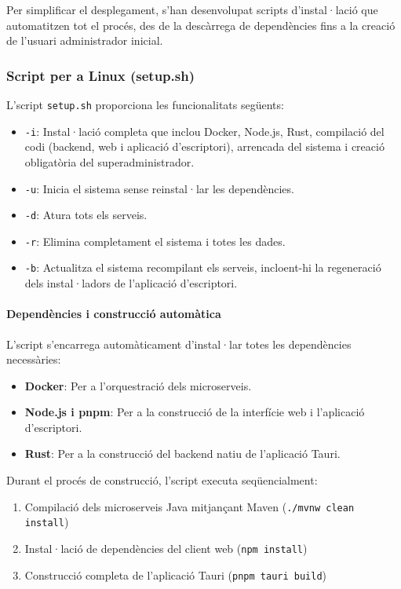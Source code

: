 Per simplificar el desplegament, s'han desenvolupat scripts d'instal·lació que automatitzen tot el procés, des de la descàrrega de dependències fins a la creació de l'usuari administrador inicial.

\subsubsection{Script per a Linux (setup.sh)}

L'script \texttt{setup.sh} proporciona les funcionalitats següents:

\begin{itemize}
  \item \texttt{-i}: Instal·lació completa que inclou Docker, Node.js, Rust, compilació del codi (backend, web i aplicació d'escriptori), arrencada del sistema i creació obligatòria del superadministrador.
  \item \texttt{-u}: Inicia el sistema sense reinstal·lar les dependències.
  \item \texttt{-d}: Atura tots els serveis.
  \item \texttt{-r}: Elimina completament el sistema i totes les dades.
  \item \texttt{-b}: Actualitza el sistema recompilant els serveis, incloent-hi la regeneració dels instal·ladors de l'aplicació d'escriptori.
\end{itemize}

\paragraph{Dependències i construcció automàtica}

L'script s'encarrega automàticament d'instal·lar totes les dependències necessàries:

\begin{itemize}
  \item \textbf{Docker}: Per a l'orquestració dels microserveis.
  \item \textbf{Node.js i pnpm}: Per a la construcció de la interfície web i l'aplicació d'escriptori.
  \item \textbf{Rust}: Per a la construcció del backend natiu de l'aplicació Tauri.
\end{itemize}

Durant el procés de construcció, l'script executa seqüencialment:

\begin{enumerate}
  \item Compilació dels microserveis Java mitjançant Maven (\texttt{./mvnw clean install})
  \item Instal·lació de dependències del client web (\texttt{npm install})
  \item Construcció completa de l'aplicació Tauri (\texttt{pnpm tauri build})
\end{enumerate}

